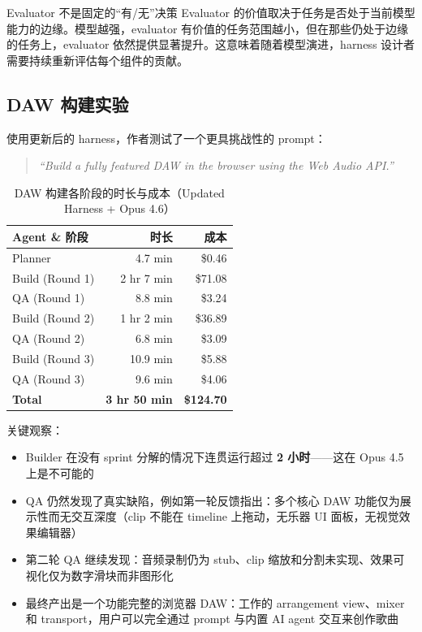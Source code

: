 \begin{warningbox}{Evaluator 不是固定的``有/无''决策}
Evaluator 的价值取决于任务是否处于当前模型能力的边缘。模型越强，evaluator 有价值的任务范围越小，但在那些仍处于边缘的任务上，evaluator 依然提供显著提升。这意味着随着模型演进，harness 设计者需要持续重新评估每个组件的贡献。
\end{warningbox}

\subsection{DAW 构建实验}

使用更新后的 harness，作者测试了一个更具挑战性的 prompt：

\begin{quote}
\textit{``Build a fully featured DAW in the browser using the Web Audio API.''}
\end{quote}

\begin{table}[H]
\centering
\begin{tabular}{lrr}
\toprule
\textbf{Agent \& 阶段} & \textbf{时长} & \textbf{成本} \\
\midrule
Planner & 4.7 min & \$0.46 \\
Build (Round 1) & 2 hr 7 min & \$71.08 \\
QA (Round 1) & 8.8 min & \$3.24 \\
Build (Round 2) & 1 hr 2 min & \$36.89 \\
QA (Round 2) & 6.8 min & \$3.09 \\
Build (Round 3) & 10.9 min & \$5.88 \\
QA (Round 3) & 9.6 min & \$4.06 \\
\midrule
\textbf{Total} & \textbf{3 hr 50 min} & \textbf{\$124.70} \\
\bottomrule
\end{tabular}
\caption{DAW 构建各阶段的时长与成本（Updated Harness + Opus 4.6）}
\end{table}

关键观察：

\begin{itemize}
    \item Builder 在没有 sprint 分解的情况下连贯运行超过 \textbf{2 小时}——这在 Opus 4.5 上是不可能的
    \item QA 仍然发现了真实缺陷，例如第一轮反馈指出：多个核心 DAW 功能仅为展示性而无交互深度（clip 不能在 timeline 上拖动，无乐器 UI 面板，无视觉效果编辑器）
    \item 第二轮 QA 继续发现：音频录制仍为 stub、clip 缩放和分割未实现、效果可视化仅为数字滑块而非图形化
    \item 最终产出是一个功能完整的浏览器 DAW：工作的 arrangement view、mixer 和 transport，用户可以完全通过 prompt 与内置 AI agent 交互来创作歌曲
\end{itemize}

